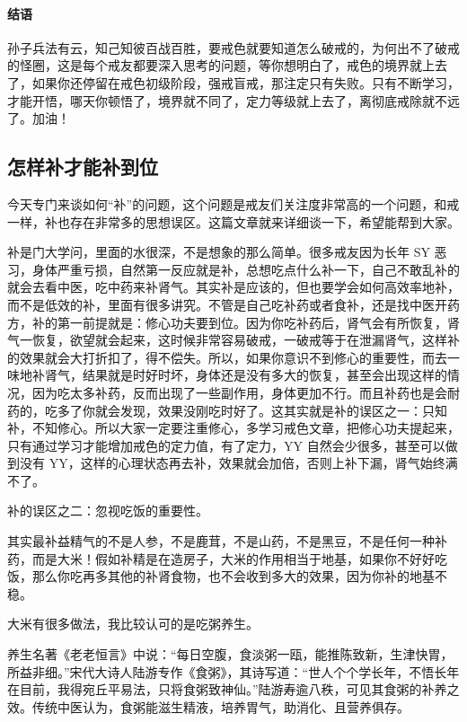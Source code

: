 \documentclass{ctexart}
\begin{document}
\paragraph{结语}

孙子兵法有云，知己知彼百战百胜，要戒色就要知道怎么破戒的，为何出不了破戒的怪圈，这是每个戒友都要深入思考的问题，等你想明白了，戒色的境界就上去了，如果你还停留在戒色初级阶段，强戒盲戒，那注定只有失败。只有不断学习，才能开悟，哪天你顿悟了，境界就不同了，定力等级就上去了，离彻底戒除就不远了。加油！

\subsection{怎样补才能补到位}

今天专门来谈如何“补”的问题，这个问题是戒友们关注度非常高的一个问题，和戒一样，补也存在非常多的思想误区。这篇文章就来详细谈一下，希望能帮到大家。

补是门大学问，里面的水很深，不是想象的那么简单。很多戒友因为长年 SY 恶习，身体严重亏损，自然第一反应就是补，总想吃点什么补一下，自己不敢乱补的就会去看中医，吃中药来补肾气。其实补是应该的，但也要学会如何高效率地补，而不是低效的补，里面有很多讲究。不管是自己吃补药或者食补，还是找中医开药方，补的第一前提就是：修心功夫要到位。因为你吃补药后，肾气会有所恢复，肾气一恢复，欲望就会起来，这时候非常容易破戒，一破戒等于在泄漏肾气，这样补的效果就会大打折扣了，得不偿失。所以，如果你意识不到修心的重要性，而去一味地补肾气，结果就是时好时坏，身体还是没有多大的恢复，甚至会出现这样的情况，因为吃太多补药，反而出现了一些副作用，身体更加不行。而且补药也是会耐药的，吃多了你就会发现，效果没刚吃时好了。这其实就是补的误区之一：只知补，不知修心。所以大家一定要注重修心，多学习戒色文章，把修心功夫提起来，只有通过学习才能增加戒色的定力值，有了定力，YY 自然会少很多，甚至可以做到没有 YY，这样的心理状态再去补，效果就会加倍，否则上补下漏，肾气始终满不了。

补的误区之二：忽视吃饭的重要性。

其实最补益精气的不是人参，不是鹿茸，不是山药，不是黑豆，不是任何一种补药，而是大米！假如补精是在造房子，大米的作用相当于地基，如果你不好好吃饭，那么你吃再多其他的补肾食物，也不会收到多大的效果，因为你补的地基不稳。

大米有很多做法，我比较认可的是吃粥养生。

养生名著《老老恒言》中说：“每日空腹，食淡粥一瓯，能推陈致新，生津快胃，所益非细。”宋代大诗人陆游专作《食粥》，其诗写道：“世人个个学长年，不悟长年在目前，我得宛丘平易法，只将食粥致神仙。”陆游寿逾八秩，可见其食粥的补养之效。传统中医认为，食粥能滋生精液，培养胃气，助消化、且营养俱存。
\end{document}
